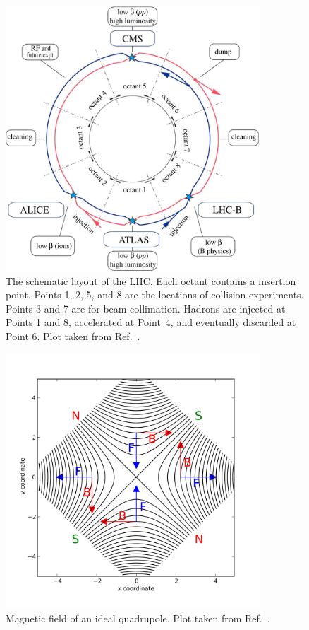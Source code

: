 \begin{figure}[!htb]
    \centering
    \includegraphics[width=0.85\textwidth]{pics/LHC_CMS/LHC_scheme.jpg}
    \caption{The schematic layout of the LHC. Each octant contains a insertion point.
             Points 1, 2, 5, and 8 are the locations of collision experiments. Points 3 and 7 are for beam collimation. 
             Hadrons are injected at Points 1 and 8, accelerated at Point~4, and eventually discarded at Point 6.
             Plot taken from Ref.~\cite{Evans_2008}. }
    \label{fig:lhc_scheme}
\end{figure}

\begin{figure}[!htb]
    \centering
    \captionsetup{justification=centering}
    \includegraphics[width=0.85\textwidth]{pics/LHC_CMS/quadrupole_field.png}
    \caption{Magnetic field of an ideal quadrupole.
             Plot taken from Ref.~\cite{quadrupole_wiki}.}
    \label{fig:quad_field}
\end{figure}

